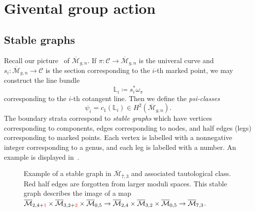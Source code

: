 \documentclass[leqno, openany]{memoir}
\theoremstyle{definition}
\theoremstyle{remark}
\theoremstyle{plain}
\theoremstyle{definition}
\theoremstyle{remark}
\newcommand{\mc}[1]{\mathcal{#1}}
\newcommand{\ol}[1]{\overline{#1}}
\begin{document}
\section{Givental group action}
\label{sec:givental_group}

\subsection{Stable graphs}
\label{subsec:stable_graphs}

Recall our picture~ of $\ol{\mc{M}}_{g,n}$. If $\pi \colon \mc{C} \to \ol{\mc{M}}_{g,n}$ is the univeral curve and $s_i \colon \ol{\mc{M}}_{g,n} \to \mc{C}$ is the section corresponding to the $i$-th marked point, we may construct the line bundle
\[ \mathbb{L}_i \coloneqq s_i^* \omega_{\pi} \]
corresponding to the $i$-th cotangent line. Then we define the \textit{psi-classes}
\[ \psi_i = c_1(\mathbb{L}_i) \in H^2(\ol{\mc{M}}_{g,n}). \]
The boundary strata correspond to \textit{stable graphs} which have vertices corresponding to components, edges corresponding to nodes, and half edges (legs) corresponding to marked points. Each vertex is labelled with a nonnegative integer corresponding to a genus, and each leg is labelled with a number. An example is displayed in~.

\begin{figure}[htpb]
  \centering
  \caption{Example of a stable graph in $\ol{\mc{M}}_{7,3}$ and associated tautological class. Red half edges are forgotten from larger moduli spaces. This stable graph describes the image of a map
    $\ol{\mc{M}}_{2,4+\color{red} 1} \times \ol{\mc{M}}_{3,2+\color{red} 2} \times \ol{\mc{M}}_{0,5} \to \ol{\mc{M}}_{2,4} \times \ol{\mc{M}}_{3,2} \times \ol{\mc{M}}_{0,5} \to \ol{\mc{M}}_{7,3}$.}
  \label{fig:stablegraph}
\end{figure}
\end{document}
